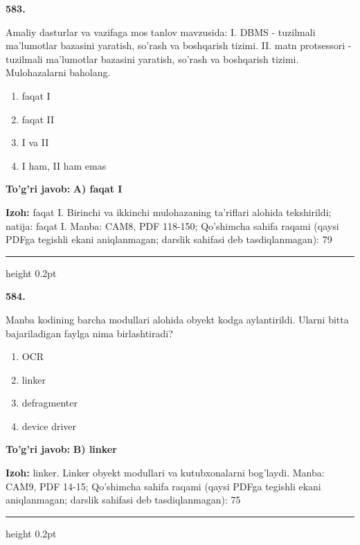\documentclass[10pt,a4paper]{article}
\begin{document}
{\bfseries\sffamily\color{ink} 583.}
\par
Amaliy dasturlar va vazifaga mos tanlov mavzusida: I. DBMS - tuzilmali ma'lumotlar bazasini yaratish, so'rash va boshqarish tizimi. II. matn protsessori - tuzilmali ma'lumotlar bazasini yaratish, so'rash va boshqarish tizimi. Mulohazalarni baholang.
\begin{enumerate}[label=\Alph*),leftmargin=9mm]
\item faqat I
\item faqat II
\item I va II
\item I ham, II ham emas
\end{enumerate}
\begin{tcolorbox}[enhanced,breakable,colback=teal!4,colframe=teal!60!black,boxrule=0.45pt,arc=1.2mm,left=2.7mm,right=2.7mm,top=1.8mm,bottom=1.8mm,before skip=2mm,after skip=2mm]
{\bfseries\sffamily\color{teal}To'g'ri javob:} \textbf{A) faqat I}
\par\smallskip
{\bfseries Izoh:} faqat I. Birinchi va ikkinchi mulohazaning ta'riflari alohida tekshirildi; natija: faqat I. Manba: CAM8, PDF 118-150; Qo'shimcha sahifa raqami (qaysi PDFga tegishli ekani aniqlanmagan; darslik sahifasi deb tasdiqlanmagan): 79
\end{tcolorbox}
\vspace{2mm}\hrule height 0.2pt\vspace{3mm}

{\bfseries\sffamily\color{ink} 584.}
\par
Manba kodining barcha modullari alohida obyekt kodga aylantirildi. Ularni bitta bajariladigan faylga nima birlashtiradi?
\begin{enumerate}[label=\Alph*),leftmargin=9mm]
\item OCR
\item linker
\item defragmenter
\item device driver
\end{enumerate}
\begin{tcolorbox}[enhanced,breakable,colback=teal!4,colframe=teal!60!black,boxrule=0.45pt,arc=1.2mm,left=2.7mm,right=2.7mm,top=1.8mm,bottom=1.8mm,before skip=2mm,after skip=2mm]
{\bfseries\sffamily\color{teal}To'g'ri javob:} \textbf{B) linker}
\par\smallskip
{\bfseries Izoh:} linker. Linker obyekt modullari va kutubxonalarni bog'laydi. Manba: CAM9, PDF 14-15; Qo'shimcha sahifa raqami (qaysi PDFga tegishli ekani aniqlanmagan; darslik sahifasi deb tasdiqlanmagan): 75
\end{tcolorbox}
\vspace{2mm}\hrule height 0.2pt\vspace{3mm}
\end{document}
